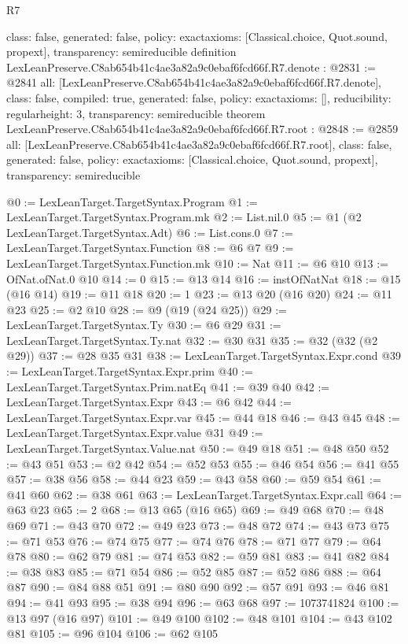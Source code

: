 \begin{lexlean}{R7}
\begin{coremodule}
{  class: false,
  generated: false,
  policy: exact{axioms: [Classical.choice, Quot.sound, propext]},
  transparency: semireducible
}
definition LexLeanPreserve.C8ab654b41c4ae3a82a9c0ebaf6fcd66f.R7.denote : @2831 := @2841 {
  all: [LexLeanPreserve.C8ab654b41c4ae3a82a9c0ebaf6fcd66f.R7.denote],
  class: false,
  compiled: true,
  generated: false,
  policy: exact{axioms: []},
  reducibility: regular{height: 3},
  transparency: semireducible
}
theorem LexLeanPreserve.C8ab654b41c4ae3a82a9c0ebaf6fcd66f.R7.root : @2848 := @2859 {
  all: [LexLeanPreserve.C8ab654b41c4ae3a82a9c0ebaf6fcd66f.R7.root],
  class: false,
  generated: false,
  policy: exact{axioms: [Classical.choice, Quot.sound, propext]},
  transparency: semireducible
}

@0 := LexLeanTarget.TargetSyntax.Program
@1 := LexLeanTarget.TargetSyntax.Program.mk
@2 := List.nil.{0}
@5 := @1 (@2 LexLeanTarget.TargetSyntax.Adt)
@6 := List.cons.{0}
@7 := LexLeanTarget.TargetSyntax.Function
@8 := @6 @7
@9 := LexLeanTarget.TargetSyntax.Function.mk
@10 := Nat
@11 := @6 @10
@13 := OfNat.ofNat.{0} @10
@14 := 0
@15 := @13 @14
@16 := instOfNatNat
@18 := @15 (@16 @14)
@19 := @11 @18
@20 := 1
@23 := @13 @20 (@16 @20)
@24 := @11 @23
@25 := @2 @10
@28 := @9 (@19 (@24 @25))
@29 := LexLeanTarget.TargetSyntax.Ty
@30 := @6 @29
@31 := LexLeanTarget.TargetSyntax.Ty.nat
@32 := @30 @31
@35 := @32 (@32 (@2 @29))
@37 := @28 @35 @31
@38 := LexLeanTarget.TargetSyntax.Expr.cond
@39 := LexLeanTarget.TargetSyntax.Expr.prim
@40 := LexLeanTarget.TargetSyntax.Prim.natEq
@41 := @39 @40
@42 := LexLeanTarget.TargetSyntax.Expr
@43 := @6 @42
@44 := LexLeanTarget.TargetSyntax.Expr.var
@45 := @44 @18
@46 := @43 @45
@48 := LexLeanTarget.TargetSyntax.Expr.value @31
@49 := LexLeanTarget.TargetSyntax.Value.nat
@50 := @49 @18
@51 := @48 @50
@52 := @43 @51
@53 := @2 @42
@54 := @52 @53
@55 := @46 @54
@56 := @41 @55
@57 := @38 @56
@58 := @44 @23
@59 := @43 @58
@60 := @59 @54
@61 := @41 @60
@62 := @38 @61
@63 := LexLeanTarget.TargetSyntax.Expr.call
@64 := @63 @23
@65 := 2
@68 := @13 @65 (@16 @65)
@69 := @49 @68
@70 := @48 @69
@71 := @43 @70
@72 := @49 @23
@73 := @48 @72
@74 := @43 @73
@75 := @71 @53
@76 := @74 @75
@77 := @74 @76
@78 := @71 @77
@79 := @64 @78
@80 := @62 @79
@81 := @74 @53
@82 := @59 @81
@83 := @41 @82
@84 := @38 @83
@85 := @71 @54
@86 := @52 @85
@87 := @52 @86
@88 := @64 @87
@90 := @84 @88 @51
@91 := @80 @90
@92 := @57 @91
@93 := @46 @81
@94 := @41 @93
@95 := @38 @94
@96 := @63 @68
@97 := 1073741824
@100 := @13 @97 (@16 @97)
@101 := @49 @100
@102 := @48 @101
@104 := @43 @102 @81
@105 := @96 @104
@106 := @62 @105

\end{coremodule}
\end{lexlean}
